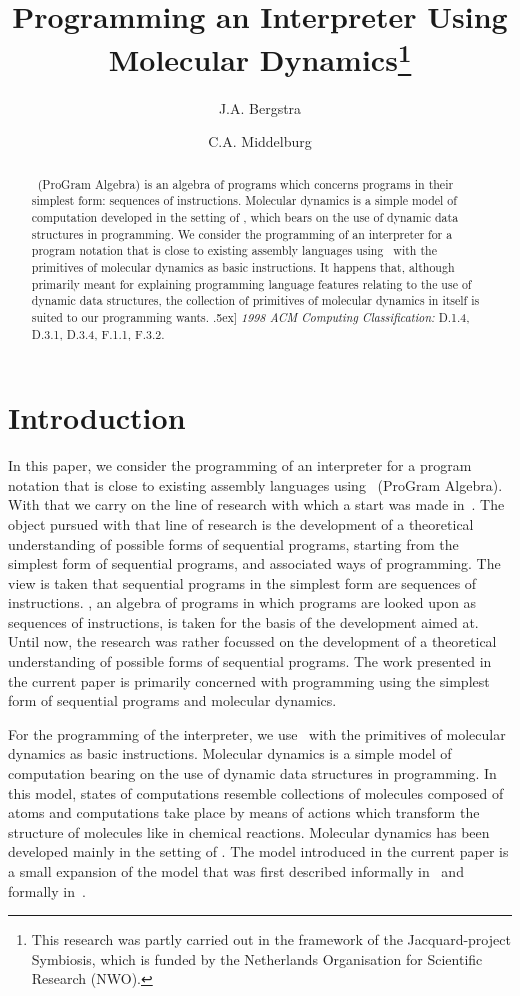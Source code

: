 \documentclass[fleqn]{llncs}
\title{Programming an Interpreter Using\\ Molecular Dynamics\thanks{This research was partly carried out in the framework of
               the Jacquard-project Symbiosis, which is funded by the
               Netherlands Organisation for Scientific Research (NWO).}}
\author{J.A. Bergstra\inst{1}\fnmsep\inst{2}
        \and
        C.A. Middelburg\inst{1}
       }
\institute{Programming Research Group,
           University of Amsterdam, \\
           P.O.~Box~41882, 1009~DB~Amsterdam, the Netherlands \\
           \and
           Department of Philosophy,
           Utrecht University, \\
           P.O.~Box~80126, 3508~TC~Utrecht, the Netherlands \\
           \email{J.A.Bergstra@uva.nl,C.A.Middelburg@uva.nl}
          }
\begin{document}
\maketitle

\begin{abstract}
\sloppy
\PGA\ (ProGram Algebra) is an algebra of programs which concerns
programs in their simplest form: sequences of instructions.
Molecular dynamics is a simple model of computation developed in the
setting of \PGA, which bears on the use of dynamic data structures in
programming.
We consider the programming of an interpreter for a program notation
that is close to existing assembly languages using \PGA\ with the
primitives of molecular dynamics as basic instructions.
It happens that, although primarily meant for explaining programming
language features relating to the use of dynamic data structures, the
collection of primitives of molecular dynamics in itself is suited to
our programming wants.
\1.5ex]
{\sl 1998 ACM Computing Classification:}
D.1.4, D.3.1, D.3.4, F.1.1, F.3.2.
\end{abstract}

\section{Introduction}
\label{sect-intro}

In this paper, we consider the programming of an interpreter for a
program notation that is close to existing assembly languages using
\PGA\ (ProGram Algebra).
With that we carry on the line of research with which a start was made
in~\cite{BL02a}.
The object pursued with that line of research is the development of a
theoretical understanding of possible forms of sequential programs,
starting from the simplest form of sequential programs, and associated
ways of programming.
The view is taken that sequential programs in the simplest form are
sequences of instructions.
\PGA, an algebra of programs in which programs are looked upon as
sequences of instructions, is taken for the basis of the development
aimed at.
Until now, the research was rather focussed on the development of a
theoretical understanding of possible forms of sequential programs.
The work presented in the current paper is primarily concerned with
programming using the simplest form of sequential programs and molecular
dynamics.

For the programming of the interpreter, we use \PGA\ with the primitives
of molecular dynamics as basic instructions.
Molecular dynamics is a simple model of computation bearing on the use
of dynamic data structures in programming.
In this model, states of computations resemble collections of molecules
composed of atoms and computations take place by means of actions which
transform the structure of molecules like in chemical reactions.
Molecular dynamics has been developed mainly in the setting of \PGA.
The model introduced in the current paper is a small expansion of the
model that was first described informally in~\cite{BB02a} and formally
in~\cite{BM06c}.
\end{document}
